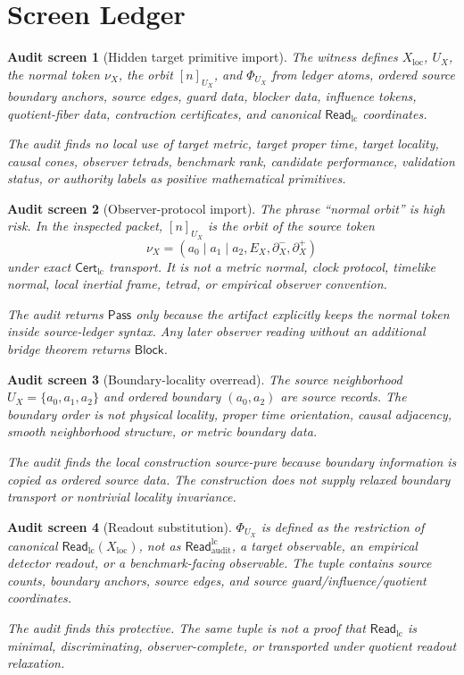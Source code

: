 \documentclass[11pt]{article}
\newcommand{\CertLC}{\mathsf{Cert}_{\mathrm{lc}}}
\newcommand{\ReadLC}{\mathsf{Read}_{\mathrm{lc}}}
\newcommand{\ReadAudit}{\mathsf{Read}_{\mathrm{audit}}^{\mathrm{lc}}}
\newcommand{\Pass}{\mathsf{Pass}}
\newcommand{\Block}{\mathsf{Block}}
\newtheorem{screen}{Audit screen}
\begin{document}
\section{Screen Ledger}

\begin{screen}[Hidden target primitive import]
The witness defines \(X_{\mathrm{loc}}\), \(U_X\), the normal token
\(\nu_X\), the orbit \([n]_{U_X}\), and \(\Phi_{U_X}\) from ledger
atoms, ordered source boundary anchors, source edges, guard data,
blocker data, influence tokens, quotient-fiber data, contraction
certificates, and canonical \(\ReadLC\) coordinates.

The audit finds no local use of target metric, target proper time,
target locality, causal cones, observer tetrads, benchmark rank,
candidate performance, validation status, or authority labels as
positive mathematical primitives.
\end{screen}

\begin{screen}[Observer-protocol import]
The phrase ``normal orbit'' is high risk. In the inspected packet,
\([n]_{U_X}\) is the orbit of the source token
\[
    \nu_X=(a_0\mid a_1\mid a_2,E_X,\partial^-_X,\partial^+_X)
\]
under exact \(\CertLC\) transport. It is not a metric normal, clock
protocol, timelike normal, local inertial frame, tetrad, or empirical
observer convention.

The audit returns \(\Pass\) only because the artifact explicitly keeps
the normal token inside source-ledger syntax. Any later observer
reading without an additional bridge theorem returns \(\Block\).
\end{screen}

\begin{screen}[Boundary-locality overread]
The source neighborhood \(U_X=\{a_0,a_1,a_2\}\) and ordered boundary
\((a_0,a_2)\) are source records. The boundary order is not physical
locality, proper time orientation, causal adjacency, smooth
neighborhood structure, or metric boundary data.

The audit finds the local construction source-pure because boundary
information is copied as ordered source data. The construction does
not supply relaxed boundary transport or nontrivial locality
invariance.
\end{screen}

\begin{screen}[Readout substitution]
\(\Phi_{U_X}\) is defined as the restriction of canonical
\(\ReadLC(X_{\mathrm{loc}})\), not as \(\ReadAudit\), a target
observable, an empirical detector readout, or a benchmark-facing
observable. The tuple contains source counts, boundary anchors, source
edges, and source guard/influence/quotient coordinates.

The audit finds this protective. The same tuple is not a proof that
\(\ReadLC\) is minimal, discriminating, observer-complete, or
transported under quotient readout relaxation.
\end{screen}
\end{document}
